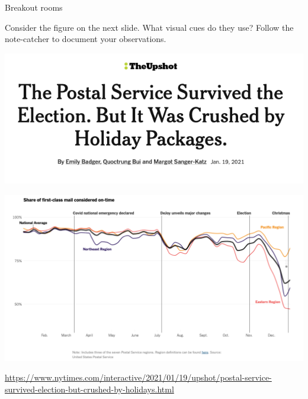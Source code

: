 \documentclass[table]{beamer}\usepackage[]{graphicx}\usepackage[]{color}
\begin{document}

\begin{frame}[fragile]{Breakout rooms}

Consider the figure on the next slide. What visual cues do they use? Follow the note-catcher to document your observations. 

\end{frame}



\begin{frame}

\centering

\includegraphics[width=.6\textwidth]{../lecture1-story-examples/figure-static/upshot-postal-banner.png}

\includegraphics[width=.9\textwidth]{../lecture1-story-examples/figure-static/upshot-postal-timeseries.png}

\tiny \url{https://www.nytimes.com/interactive/2021/01/19/upshot/postal-service-survived-election-but-crushed-by-holidays.html}

\end{frame}


\end{document}
